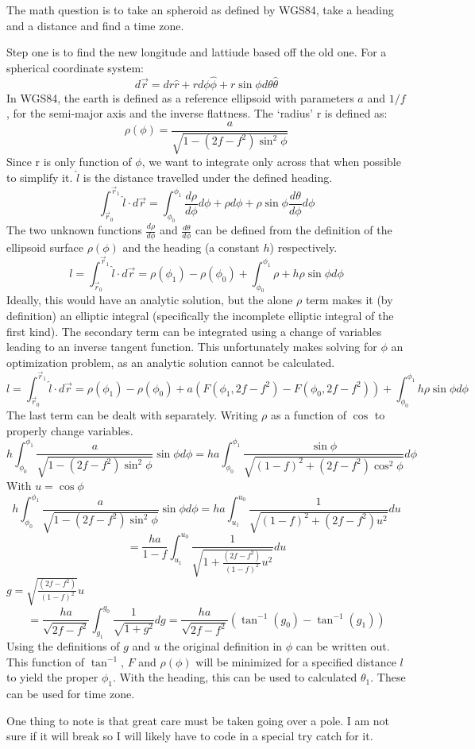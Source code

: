 \documentclass[10pt,a4paper]{letter}
\author{Ian Faust}
\begin{document}
The math question is to take an spheroid as defined by WGS84, take a heading and a distance and find a time zone.

Step one is to find the new longitude and lattiude based off the old one. For a spherical coordinate system:
\[
d\vec{r} = dr\hat{r} + r d\phi\hat{\phi} + r \sin \phi d\theta\hat{\theta}
\]
In WGS84, the earth is defined as a reference ellipsoid with parameters $a$ and $1/f$, for the semi-major axis and the inverse flattness. The `radius' r is defined as:
\[
	\rho(\phi) = \frac{a}{\sqrt{1-(2f-f^2)\sin^2\phi}}
\]
Since r is only function of $\phi$, we want to integrate only across that when possible to simplify it. $\hat{l}$ is the distance travelled under the defined heading.
\[
\int_{\vec{r}_0}^{\vec{r}_1} \hat{l} \cdot d\vec{r} = \int_{\phi_0}^{\phi_1} \frac{d\rho}{d\phi}d\phi + \rho d\phi + \rho \sin \phi \frac{d\theta}{d\phi}d\phi
\]
The two unknown functions $\frac{d\rho}{d\phi}$ and $\frac{d\theta}{d\phi}$ can be defined from the definition of the ellipsoid surface $\rho(\phi)$ and the heading (a constant $h$) respectively.
\[
l = \int_{\vec{r}_0}^{\vec{r}_1} \hat{l} \cdot d\vec{r} = \rho(\phi_1) - \rho(\phi_0) + \int_{\phi_0}^{\phi_1} \rho + h\rho \sin \phi d\phi
\]
Ideally, this would have an analytic solution, but the alone $\rho$ term makes it (by definition) an elliptic integral (specifically the incomplete elliptic integral of the first kind).  The secondary term can be integrated using a change of variables leading to an inverse tangent function.  This unfortunately makes solving for $\phi$ an optimization problem, as an analytic solution cannot be calculated.
\[
l = \int_{\vec{r}_0}^{\vec{r}_1} \hat{l} \cdot d\vec{r} = \rho(\phi_1) - \rho(\phi_0) + a(F(\phi_1,2f-f^2) - F(\phi_0,2f-f^2))  + \int_{\phi_0}^{\phi_1} h\rho \sin \phi d\phi
\]
The last term can be dealt with separately.  Writing $\rho$ as a function of $\cos$ to properly change variables.
\[
h\int_{\phi_0}^{\phi_1} \frac{a}{\sqrt{1-(2f-f^2)\sin^2\phi}} \sin \phi d\phi = ha\int_{\phi_0}^{\phi_1} \frac{\sin \phi}{\sqrt{(1-f)^2+(2f-f^2)\cos^2\phi}}d\phi
\]
With $u = \cos \phi$
\[
h\int_{\phi_0}^{\phi_1} \frac{a}{\sqrt{1-(2f-f^2)\sin^2\phi}} \sin \phi d\phi = ha\int_{u_1}^{u_0} \frac{1}{\sqrt{(1-f)^2+(2f-f^2)u^2}}du
\]
\[
= \frac{ha}{1-f} \int_{u_1}^{u_0} \frac{1}{\sqrt{1+\frac{(2f-f^2)}{(1-f)^2}u^2}}du
\]
$g  = \sqrt{\frac{(2f-f^2)}{(1-f)^2}}u$
\[
= \frac{ha}{\sqrt{2f-f^2}} \int_{g_1}^{g_0} \frac{1}{\sqrt{1+g^2}}dg= \frac{ha}{\sqrt{2f-f^2}}(\tan^{-1}(g_0) - \tan^{-1}(g_1))
\]
Using the definitions of $g$ and $u$ the original definition in $\phi$ can be written out.  This function of $\tan^{-1}$, $F$ and $\rho(\phi)$ will be minimized for a specified distance $l$ to yield the proper $\phi_1$.  With the heading, this can be used to calculated $\theta_1$. These can be used for time zone.

One thing to note is that great care must be taken going over a pole. I am not sure if it will break so I will likely have to code in a special try catch for it. 
\end{document}
